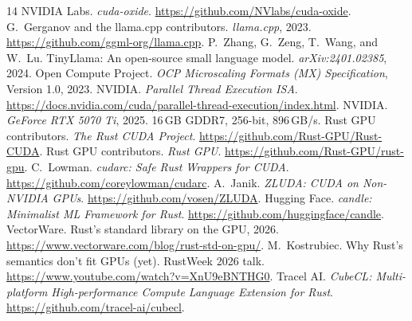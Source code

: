 \documentclass[11pt]{article}
\begin{document}
\begin{thebibliography}{14}
 NVIDIA Labs. \emph{cuda-oxide}. \url{https://github.com/NVlabs/cuda-oxide}.
 G.~Gerganov and the llama.cpp contributors. \emph{llama.cpp}, 2023. \url{https://github.com/ggml-org/llama.cpp}.
 P.~Zhang, G.~Zeng, T.~Wang, and W.~Lu. TinyLlama: An open-source small language model. \emph{arXiv:2401.02385}, 2024.
 Open Compute Project. \emph{OCP Microscaling Formats (MX) Specification}, Version 1.0, 2023.
 NVIDIA. \emph{Parallel Thread Execution ISA}. \url{https://docs.nvidia.com/cuda/parallel-thread-execution/index.html}.
 NVIDIA. \emph{GeForce RTX 5070 Ti}, 2025. 16\,GB GDDR7, 256-bit, 896\,GB/s.
 Rust GPU contributors. \emph{The Rust CUDA Project}. \url{https://github.com/Rust-GPU/Rust-CUDA}.
 Rust GPU contributors. \emph{Rust GPU}. \url{https://github.com/Rust-GPU/rust-gpu}.
 C.~Lowman. \emph{cudarc: Safe Rust Wrappers for CUDA}. \url{https://github.com/coreylowman/cudarc}.
 A.~Janik. \emph{ZLUDA: CUDA on Non-NVIDIA GPUs}. \url{https://github.com/vosen/ZLUDA}.
 Hugging Face. \emph{candle: Minimalist ML Framework for Rust}. \url{https://github.com/huggingface/candle}.
 VectorWare. Rust's standard library on the GPU, 2026. \url{https://www.vectorware.com/blog/rust-std-on-gpu/}.
 M.~Kostrubiec. Why Rust's semantics don't fit GPUs (yet). RustWeek 2026 talk. \url{https://www.youtube.com/watch?v=XnU9eBNTHG0}.
 Tracel AI. \emph{CubeCL: Multi-platform High-performance Compute Language Extension for Rust}. \url{https://github.com/tracel-ai/cubecl}.
\end{thebibliography}
\end{document}
